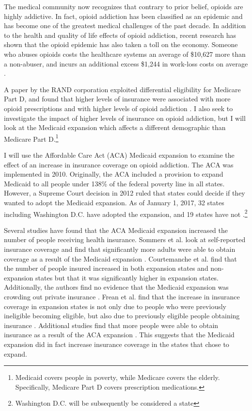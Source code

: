 \documentclass[11pt]{article}
\begin{document}
The medical community now recognizes that contrary to prior belief, opioids are highly addictive. In fact, opioid addiction has been classified as an epidemic and has become one of the greatest medical challenges of the past decade.  In addition to the health and quality of life effects of opioid addiction, recent research has shown that the opioid epidemic has also taken a toll on the economy.  Someone who abuses opioids costs the healthcare systems an average of \$10,627 more than a non-abuser, and incurs an additional excess \$1,244 in work-loss costs on average \citep{Rice2014}.

A paper by the RAND corporation exploited differential eligibility for Medicare Part D, and found that higher levels of insurance were associated with more opioid prescriptions and with higher levels of opioid addiction \citep{Powell2016}.  I also seek to investigate the impact of higher levels of insurance on opioid addiction, but I will look at the Medicaid expansion which affects a different demographic than Medicare Part D.\footnote{Medicaid covers people in poverty, while Medicare covers the elderly.  Specifically, Medicare Part D covers prescription medications.}


I will use the Affordable Care Act (ACA) Medicaid expansion to examine the effect of an increase in insurance coverage on opioid addiction.  The ACA was implemented in 2010. Originally, the ACA included a provision to expand Medicaid to all people under 138\% of the federal poverty line in all states.  However, a Supreme Court decision in 2012 ruled that states could decide if they wanted to adopt the Medicaid expansion.  As of January 1, 2017, 32 states including Washington D.C. have adopted the expansion, and 19 states have not \citep{TheHenryJ.KaiserFamilyFoundation2017}.\footnote{Washington D.C. will be subsequently be considered a state}  

Several studies have found that the ACA Medicaid expansion increased the number of people receiving health insurance.  Sommers et al. look at self-reported insurance coverage and find that significantly more adults were able to obtain coverage as a result of the Medicaid expansion \citep{Sommers2015}.  Courtemanche et al. find that the number of people insured increased in both expansion states and non-expansion states but that it was significantly higher in expansion states.  Additionally, the authors find no evidence that the Medicaid expansion was crowding out private insurance \citep{Courtemanche2017}.  Frean et al. find that the increase in insurance coverage in expansion states is not only due to people who were previously ineligible becoming eligible, but also due to previously eligible people obtaining insurance \citep{Frean2016} .  Additional studies find that more people were able to obtain insurance as a result of the ACA expansion \citep{Sommers2014, Wherry2016}.  This suggests that the Medicaid expansion did in fact increase insurance coverage in the states that chose to expand.  
\end{document}
